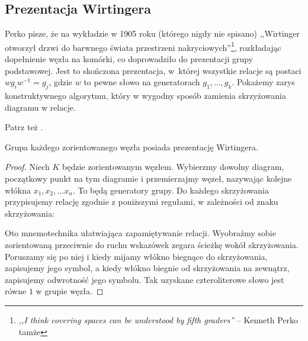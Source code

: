 %

\subsection{Prezentacja Wirtingera}
%
Perko \cite{perko2016} pisze, że na wykładzie w 1905 roku (którego nigdy nie spisano) ,,Wirtinger otworzył drzwi do barwnego świata przestrzeni nakryciowych''\footnote{\emph{,,I think covering spaces can be understood by fifth graders''} -- Kenneth Perko tamże}, rozkładając dopełnienie węzła na komórki, co doprowadziło do prezentacji grupy podstawowej.
%
%
Jest to skończona prezentacja, w~której wszystkie relacje są postaci $w g_i w^{-1} = g_j$, gdzie $w$ to pewne słowo na generatorach $g_1, \ldots, g_k$.
Pokażemy zarys konstruktywnego algorytmu, który w wygodny sposób zamienia skrzyżowania diagramu w relacje.

Patrz też \cite[s. 32-39]{burde2014}.

\begin{proposition}
    Grupa każdego zorientowanego węzła posiada prezentację Wirtingera.
\end{proposition}

\begin{proof}
    Niech $K$ będzie zorientowanym węzłem.
    Wybierzmy dowolny diagram, początkowy punkt na tym diagramie i przemierzajmy węzeł, nazywając kolejne włókna $x_1, x_2, \ldots x_{n}$.
    To będą generatory grupy.
    Do każdego skrzyżowania przypisujemy relację zgodnie z poniższymi regułami, w zależności od znaku skrzyżowania:

\noindent
    Oto mnemotechnika ułatwiająca zapamiętywanie relacji.
    Wyobraźmy sobie zorientowaną przeciwnie do ruchu wskazówek zegara ścieżkę wokół skrzyżowania.
    Poruszamy się po niej i kiedy mijamy włókno biegnące do skrzyżowania, zapisujemy jego symbol, a kiedy włókno biegnie od skrzyżowania na zewnątrz, zapisujemy odwrotność jego symbolu.
    Tak uzyskane czteroliterowe słowo jest równe $1$ w grupie węzła.
\end{proof}

